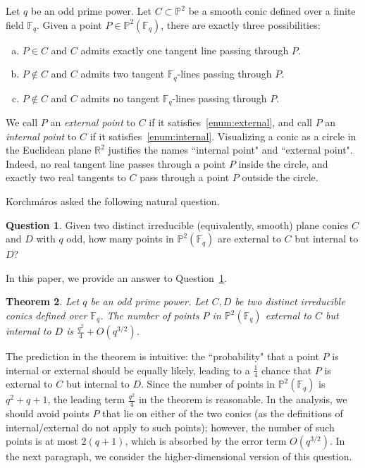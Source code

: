 \documentclass[12pt,reqno]{amsart}
\newtheorem{thm}{Theorem}[section]
\theoremstyle{definition}
\newtheorem{question}[thm]{Question}
\newcommand{\F}{\mathbb{F}}
\begin{document}
Let $q$ be an odd prime power. Let $C\subset \mathbb{P}^2$ be a smooth conic defined over a finite field $\F_q$. Given a point $P\in \mathbb{P}^2(\F_q)$, there are exactly three possibilities:
\begin{enumerate}[(a)]
\item \label{enum:on-curve} $P\in C$ and $C$ admits exactly one tangent line passing through $P$.
\item \label{enum:external} $P\notin C$ and $C$ admits two tangent $\F_q$-lines passing through $P$.
\item \label{enum:internal} $P\notin C$ and $C$ admits no tangent $\F_q$-lines passing through $P$.
\end{enumerate}
We call $P$ an \emph{external point} to $C$ if it satisfies~\eqref{enum:external}, and call $P$ an \emph{internal point} to $C$ if it satisfies~\eqref{enum:internal}. Visualizing a conic as a circle in the Euclidean plane $\mathbb{R}^2$ justifies the names ``internal point" and ``external point". Indeed, no real tangent line passes through a point $P$ inside the circle, and exactly two real tangents to $C$ pass through a point $P$ outside the circle.

Korchm\'{a}ros \cite[Problem 6.2]{K13} asked the following natural question.

\begin{question}\label{quest:korchmaros}
Given two distinct irreducible (equivalently, smooth) plane conics $C$ and $D$ with $q$ odd, how many points in $\mathbb{P}^2(\F_q)$ are external to $C$ but internal to $D$?
\end{question}

In this paper, we provide an answer to Question~\ref{quest:korchmaros}.

\begin{thm}\label{thm:main-conics}
Let $q$ be an odd prime power. Let $C, D$ be two distinct irreducible conics defined over $\F_q$. The number of points $P$ in $\mathbb{P}^2(\F_q)$ external to $C$ but internal to $D$ is $\frac{q^2}{4} + O(q^{3/2})$.
\end{thm}

The prediction in the theorem is intuitive: the ``probability" that a point $P$ is internal or external should be equally likely, leading to a $\frac{1}{4}$ chance that $P$ is external to $C$ but internal to $D$. Since the number of points in $\mathbb{P}^2(\F_q)$ is $q^2+q+1$, the leading term $\frac{q^2}{4}$ in the theorem is reasonable. In the analysis, we should avoid points $P$ that lie on either of the two conics (as the definitions of internal/external do not apply to such points); however, the number of such points is at most $2(q+1)$, which is absorbed by the error term $O(q^{3/2})$. In the next paragraph, we consider the higher-dimensional version of this question.
\end{document}
